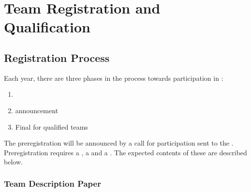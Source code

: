 \chapter{Team Registration and Qualification}

\section{Registration Process}
\label{rule:participation}

Each year, there are three phases in the process towards participation in \AtHome:
\begin{enumerate}
	\item {}
	\item {} announcement
	\item Final  for qualified teams
\end{enumerate}
The preregistration will be announced by a call for participation sent to the .
Preregistration requires a , a  and a .
The expected contents of these are described below.

\subsection{Team Description Paper}
\label{rule:website_tdp}

